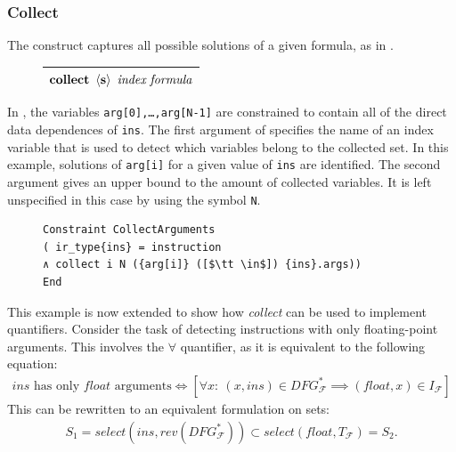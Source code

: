 \begin{figure}[h]

\end{figure}

\subsubsection{Collect}

    The  construct captures all possible solutions of a given
    formula, as in .
\begin{figure}[H]
    \centering
    \begin{tabular}{|c|}
        \hline
        $\text{\bf collect}\ \left<\text{\bf s}\right>\ \text{\it index}\ \text{\it formula}$\\
        \hline
    \end{tabular}
\end{figure}

    \noindent
    In , the variables \texttt{arg[0],\dots,arg[N-1]}
    are constrained to contain all of the direct data dependences of
    \texttt{ins}.
    The first argument of  specifies the name of an index
    variable that is used to detect which variables belong to the collected set.
    In this example, solutions of \texttt{arg[i]} for a given value
    of \texttt{ins} are identified.
    The second argument gives an upper bound to the amount of collected
    variables.
    It is left unspecified in this case by using the symbol \texttt{N}.

\begin{figure}[t]
\begin{lstlisting}[language=CAnDL,label={fig:simplecollect},caption=
   {Simple {\it collect} example in CAnDL: All direct data dependences of
    {\tt ins} are collected.\leftskip=0pt\rightskip=0pt}]
Constraint CollectArguments
( ir_type{ins} = instruction
∧ collect i N ({arg[i]} ([$\tt \in$]) {ins}.args))
End
\end{lstlisting}
\end{figure}

    This example is now extended to show how {\it collect} can be used to
    implement quantifiers.
    Consider the task of detecting instructions with only floating-point
    arguments.
    This involves the $\forall$ quantifier, as it is equivalent to
    the following equation:
    \begin{align}
        ins\text{ has only }float\text{ arguments}\iff
        \left[\forall x\colon\ (x,ins)\in DFG_\mathcal F^*\implies(float,x)\in I_\mathcal F\right]
        \label{fig:implication}
    \end{align}
    This can be rewritten to an equivalent formulation on sets:
    \begin{align*}
        S_1= select(ins,rev(DFG_\mathcal F^*))\subset select(float,T_\mathcal F)= S_2.
    \end{align*}
    

